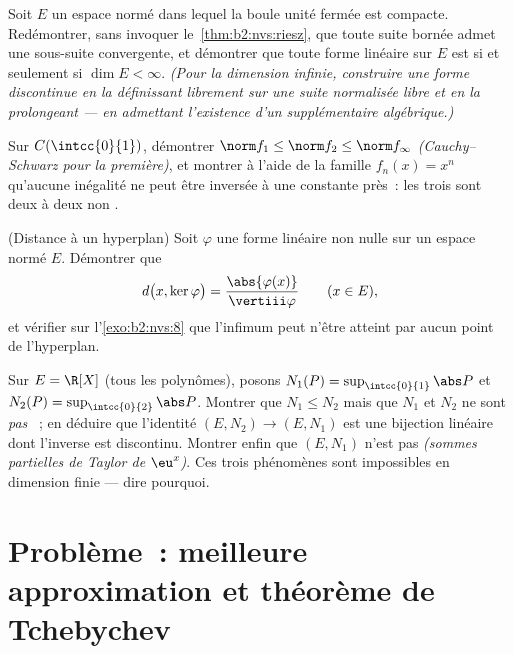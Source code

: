 \begin{exercise}[$\star\star\star$]\label{exo:b2:nvs:9}
Soit $E$ un espace normé dans lequel la boule unité fermée est compacte.
Redémontrer, sans invoquer le~\cref{thm:b2:nvs:riesz}, que toute
suite bornée admet une sous-suite convergente, et démontrer que toute
forme linéaire sur $E$ est  si et seulement si $\dim E < \infty$.
\emph{(Pour la dimension infinie, construire une forme discontinue en
la définissant librement sur une suite normalisée libre et en la
prolongeant --- en admettant l'existence d'un supplémentaire
algébrique.)}
\end{exercise}

\begin{exercise}[$\star\star$]\label{exo:b2:nvs:10}
Sur $C(\intcc{0}{1})$, démontrer $\norm f_1 \leq \norm f_2 \leq \norm
f_\infty$ \emph{(Cauchy--Schwarz pour la première)}, et montrer à l'aide
de la famille $f_n(x) = x^n$ qu'aucune inégalité ne peut être inversée
à une constante près~: les trois  sont deux à deux non
.
\end{exercise}

\begin{exercise}[$\star\star$]\label{exo:b2:nvs:11}
(Distance à un hyperplan) Soit $\varphi$ une forme linéaire 
non nulle sur un espace normé $E$. Démontrer que
\[
d\bigl(x, \ker\varphi\bigr) =
\frac{\abs{\varphi(x)}}{\vertiii\varphi}
\qquad (x \in E),
\]
et vérifier sur l'\cref{exo:b2:nvs:8} que l'infimum peut n'être
atteint par aucun point de l'hyperplan.
\end{exercise}

\begin{exercise}[$\star\star\star$]\label{exo:b2:nvs:12}
Sur $E = \R[X]$ (tous les polynômes), posons $N_1(P) =
\sup_{\intcc{0}{1}}\abs P$ et $N_2(P) =
\sup_{\intcc{0}{2}}\abs P$. Montrer que $N_1 \leq N_2$ mais que
$N_1$ et $N_2$ ne sont \emph{pas} ~; en déduire que
l'identité $(E, N_2) \to (E, N_1)$ est une bijection linéaire 
dont l'inverse est discontinu. Montrer enfin que $(E, N_1)$ n'est
pas  \emph{(sommes partielles de Taylor de $\eu^x$)}. Ces trois
phénomènes sont impossibles en dimension finie --- dire pourquoi.
\end{exercise}

\section{Problème~: meilleure approximation et théorème de Tchebychev}

